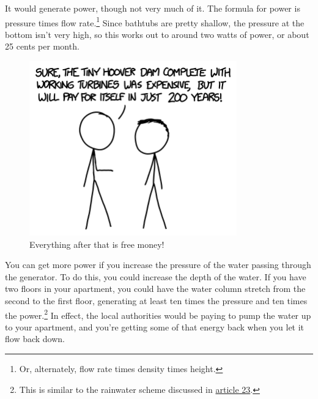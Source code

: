 {{It would generate power, though not very much of it. The formula for power is pressure times flow rate.{\footnote{Or, alternately, flow rate times density times height.} } Since bathtubs are pretty shallow, the pressure at the bottom isn't very high, so this works out to around two watts of power, or about 25 cents per month.}

\begin{figure}[!htbp]
\centering
\includegraphics[scale=0.5, max width=0.8\textwidth]{imgs/a/91/faucet_cost.png}
\caption{Everything after that is free money!}
\end{figure}

{You can get more power if you increase the pressure of the water passing through the generator. To do this, you could increase the depth of the water. If you have two floors in your apartment, you could have the water column stretch from the second to the first floor, generating at least ten times the pressure and ten times the power.{\footnote{This is similar to the rainwater scheme discussed in \href{http://what-if.xkcd.com/23/}{article 23}.} } In effect, the local authorities would be paying to pump the water up to your apartment, and you're getting some of that energy back when you let it flow back down.}

}
